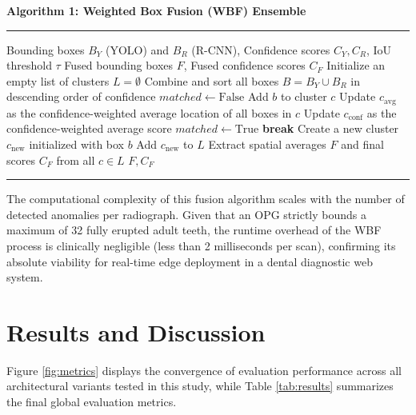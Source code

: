 \documentclass[conference]{IEEEtran}
\begin{document}
\vspace{1em}
\noindent\textbf{Algorithm 1: Weighted Box Fusion (WBF) Ensemble} \\
\hrule
\vspace{0.5em}
\begin{algorithmic}[1]
\renewcommand{\algorithmicrequire}{\textbf{Input:}}
\renewcommand{\algorithmicensure}{\textbf{Output:}}
\REQUIRE Bounding boxes $B_Y$ (YOLO) and $B_R$ (R-CNN), Confidence scores $C_Y, C_R$, IoU threshold $\tau$
\ENSURE Fused bounding boxes $F$, Fused confidence scores $C_F$
\STATE Initialize an empty list of clusters $L = \emptyset$
\STATE Combine and sort all boxes $B = B_Y \cup B_R$ in descending order of confidence
    \STATE $matched \leftarrow \text{False}$
            \STATE Add $b$ to cluster $c$
            \STATE Update $c_{\text{avg}}$ as the confidence-weighted average location of all boxes in $c$
            \STATE Update $c_{\text{conf}}$ as the confidence-weighted average score
            \STATE $matched \leftarrow \text{True}$
            \STATE \textbf{break}
        \ENDIF
    \ENDFOR
        \STATE Create a new cluster $c_{\text{new}}$ initialized with box $b$
        \STATE Add $c_{\text{new}}$ to $L$
    \ENDIF
\ENDFOR
\STATE Extract spatial averages $F$ and final scores $C_F$ from all $c \in L$
\RETURN $F, C_F$
\end{algorithmic}
\vspace{0.5em}
\hrule
\vspace{2em}

The computational complexity of this fusion algorithm scales with the number of detected anomalies per radiograph. Given that an OPG strictly bounds a maximum of 32 fully erupted adult teeth, the runtime overhead of the WBF process is clinically negligible (less than 2 milliseconds per scan), confirming its absolute viability for real-time edge deployment in a dental diagnostic web system.

\section{Results and Discussion}

Figure \ref{fig:metrics} displays the convergence of evaluation performance across all architectural variants tested in this study, while Table \ref{tab:results} summarizes the final global evaluation metrics.
\end{document}
